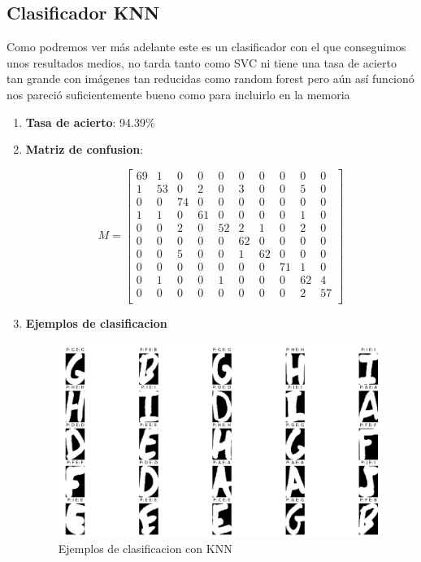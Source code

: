 \documentclass[8pt,a4paper]{article}
\begin{document}
\subsection{Clasificador KNN}

Como podremos ver más adelante este es un clasificador con el que conseguimos unos resultados medios, no tarda tanto como SVC ni tiene una tasa de acierto tan grande con imágenes tan reducidas como random forest pero aún así funcionó nos pareció suficientemente bueno como para incluirlo en la memoria
\begin{enumerate}
\item \textbf{Tasa de acierto}: 94.39$\%$
\item \textbf{Matriz de confusion}:
	
\[
M=
  \begin{bmatrix}
    69 & 1 & 0 & 0 & 0 & 0 & 0 & 0 & 0 & 0 \\
    1 & 53 & 0 & 2 & 0 & 3 & 0 & 0 & 5 & 0 \\
    0 & 0 & 74 & 0 & 0 & 0 & 0 & 0 & 0 & 0 \\
    1 & 1 & 0 & 61 & 0 & 0 & 0 & 0 & 1 & 0 \\
    0 & 0 & 2 & 0 & 52 & 2 & 1 & 0 & 2 & 0 \\
    0 & 0 & 0 & 0 & 0 & 62 & 0 & 0 & 0 & 0 \\
    0 & 0 & 5 & 0 & 0 & 1 & 62 & 0 & 0 & 0 \\
    0 & 0 & 0 & 0 & 0 & 0 & 0 & 71 & 1 & 0 \\
    0 & 1 & 0 & 0 & 1 & 0 & 0 & 0 & 62 & 4 \\
    0 & 0 & 0 & 0 & 0 & 0 & 0 & 0 & 2 & 57 \\
  \end{bmatrix}
\]

\item \textbf{Ejemplos de clasificacion}

\begin{figure}[htbp]
\centering
    \includegraphics[width=\textwidth]{./KNN_Ejemplos.png}
    \caption{Ejemplos de clasificacion con KNN}
\end{figure}
\end{enumerate}
\end{document}
